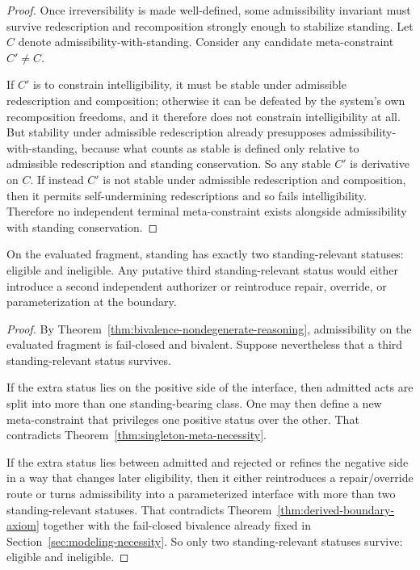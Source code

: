 \begin{proof}
Once irreversibility is made well-defined, some admissibility invariant must survive redescription and recomposition strongly enough to stabilize standing. Let $C$ denote admissibility-with-standing. Consider any candidate meta-constraint $C'\neq C$.

If $C'$ is to constrain intelligibility, it must be stable under admissible redescription and composition; otherwise it can be defeated by the system's own recomposition freedoms, and it therefore does not constrain intelligibility at all. But stability under admissible redescription already presupposes admissibility-with-standing, because what counts as stable is defined only relative to admissible redescription and standing conservation. So any stable $C'$ is derivative on $C$. If instead $C'$ is not stable under admissible redescription and composition, then it permits self-undermining redescriptions and so fails intelligibility. Therefore no independent terminal meta-constraint exists alongside admissibility with standing conservation.\cite{MaleyAMetric}
\end{proof}

\begin{corollary}
\label{cor:binary-standing-interface}
On the evaluated fragment, standing has exactly two standing-relevant statuses: eligible and ineligible. Any putative third standing-relevant status would either introduce a second independent authorizer or reintroduce repair, override, or parameterization at the boundary.
\end{corollary}

\begin{proof}
By Theorem~\ref{thm:bivalence-nondegenerate-reasoning}, admissibility on the evaluated fragment is fail-closed and bivalent. Suppose nevertheless that a third standing-relevant status survives.

If the extra status lies on the positive side of the interface, then admitted acts are split into more than one standing-bearing class. One may then define a new meta-constraint that privileges one positive status over the other. That contradicts Theorem~\ref{thm:singleton-meta-necessity}.

If the extra status lies between admitted and rejected or refines the negative side in a way that changes later eligibility, then it either reintroduces a repair/override route or turns admissibility into a parameterized interface with more than two standing-relevant statuses. That contradicts Theorem~\ref{thm:derived-boundary-axiom} together with the fail-closed bivalence already fixed in Section~\ref{sec:modeling-necessity}. So only two standing-relevant statuses survive: eligible and ineligible.\cite{MaleyAMetric}
\end{proof}

